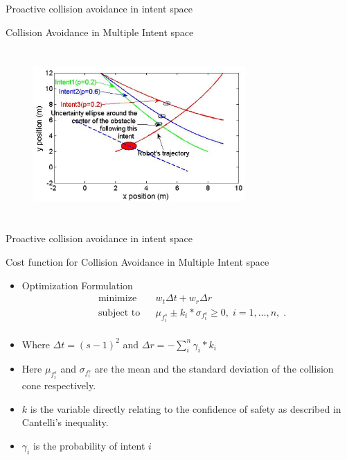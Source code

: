 \documentclass{beamer}
\begin{document}
\begin{frame}{Proactive collision avoidance in intent space}
\begin{block}{Collision Avoidance in Multiple Intent space }
\begin{figure}
\includegraphics[width= 8.1cm, height=6.5cm]{fig11.eps}
\end{figure}
\end{block}
\end{frame}
\begin{frame}{Proactive collision avoidance in intent space}
\begin{block}{Cost function for Collision Avoidance in Multiple Intent space }
\begin{itemize}
\item{Optimization Formulation}
\begin{equation*}
\begin{aligned}
& {\text{minimize}}
& & w_t\Delta t + w_r\Delta r \\
& \text{subject to}
& & \mu_{f_i^s} \pm k_i*\sigma_{f_i^s} \geq 0, \; i = 1, \ldots, n,\;. \\
\end{aligned}
\end{equation*}

\item{Where $\Delta t = (s-1)^2$ and $\Delta r = -\sum_i^{n}\gamma_{i}*k_i$}

\item{Here $\mu_{f_i^s}$ and $\sigma_{f_i^s}$ are the mean and the standard deviation of the collision cone respectively.}
\item{$k$ is the variable directly relating to the confidence of safety as described in Cantelli's inequality.} 
\item{$\gamma_i$ is the probability of intent $i$}
\end{itemize}
\end{block}
\end{frame}
\end{document}

